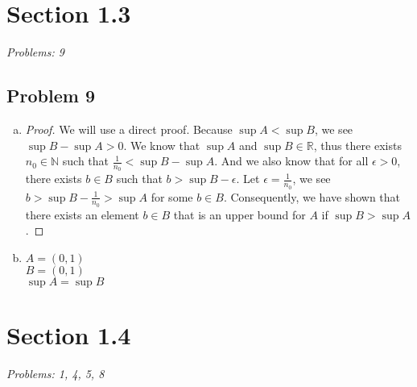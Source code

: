 \documentclass[12pt]{article}
\begin{document}

\section*{Section 1.3}
\textit{Problems: 9}

\subsection*{Problem 9}
\begin{enumerate}[a).]
    \item {
    \begin{proof}
    We will use a direct proof. 
    Because $\sup A < \sup B$, we see $\sup B - \sup A > 0$.
    We know that $\sup A$ and $ \sup B \in \mathbb{R}$, thus there exists $n_0 \in \mathbb{N}$ such that $\frac{1}{n_0} < \sup B - \sup A$. 
    And we also know that for all $\epsilon > 0$, there exists $b \in B$ such that $b > \sup B - \epsilon$. 
    Let $\epsilon = \frac{1}{n_0}$, we see $b > \sup B - \frac{1}{n_0} > \sup A$ for some $b \in B$. 
    Consequently, we have shown that there exists an element $b \in B$ that is an upper bound for $A$ if $\sup B > \sup A$. 
    \end{proof}
    }

    \item {
    $A = \left( 0,1 \right)$\\
    $B = \left( 0, 1\right)$\\
    $\sup A = \sup B$

    }

\end{enumerate}



\vspace*{1cm}


\section*{Section 1.4}
\textit{Problems: 1, 4, 5, 8}
\end{document}
